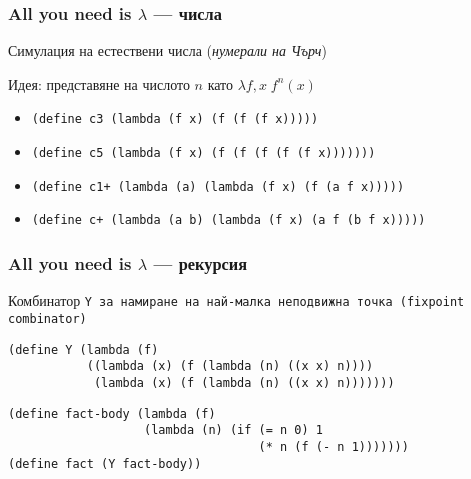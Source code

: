 \documentclass{beamer}
\begin{document}
\begin{frame}[fragile]
  \frametitle{All you need is $\lambda$ --- числа}

  Симулация на естествени числа (\emph{нумерали на Чърч})

  Идея: представяне на числото $n$ като $\lambda f,x \;f^n(x)$
  \vspace{1em}
  \pause

  \begin{itemize}[<+->]
  \item \tt{(define c3 (lambda (f x) (f (f (f x)))))}
  \item \tt{(define c5 (lambda (f x) (f (f (f (f (f x)))))))}
  \item \tt{(define c1+ (lambda (a) (lambda (f x) (f (a f x)))))}
  \item \tt{(define c+ (lambda (a b) (lambda (f x) (a f (b f x)))))}
  \end{itemize}
\end{frame}

\begin{frame}[fragile]
  \frametitle{All you need is $\lambda$ --- рекурсия}

  Комбинатор \tt Y за намиране на най-малка неподвижна точка (fixpoint combinator)

\begin{verbatim}
(define Y (lambda (f)
           ((lambda (x) (f (lambda (n) ((x x) n))))
            (lambda (x) (f (lambda (n) ((x x) n)))))))
\end{verbatim}

\pause

\begin{verbatim}
(define fact-body (lambda (f)
                   (lambda (n) (if (= n 0) 1
                                   (* n (f (- n 1)))))))
(define fact (Y fact-body))
\end{verbatim}
\end{frame}
\end{document}
